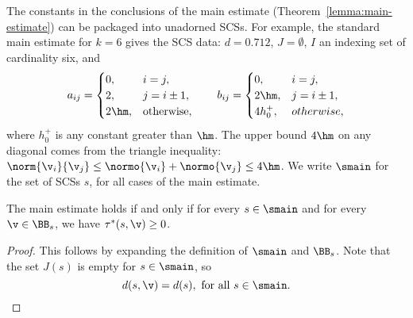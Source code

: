 \begin{definition}[$\smain$]\label{ex:main} 
The constants in the conclusions of the main estimate
  (Theorem~\ref{lemma:main-estimate}) can be packaged into unadorned SCSs.  
For example, the standard main estimate for $k=6$ gives
  the SCS data: $d=0.712$, $J=\emptyset$, $I$ an indexing set
  of cardinality six, and
\[
a_{ij} = \begin{cases} 0, & i=j,\\
  2, & j= i\pm1,\\
  2 \hm, & \text{otherwise},
  \end{cases}
\qquad
b_{ij}=\begin{cases}
 0, & i=j,\\
 2\hm, & j= i\pm1,\\
 4h_0^+, & otherwise,
  \end{cases}
\]
where $h_0^+$ is any constant greater than $\hm$.
The upper bound $4\hm$ on any diagonal comes from the triangle
inequality: $\norm{\v_i}{\v_j} \le \normo{\v_i}+\normo{\v_j} \le
4\hm$.   
We write $\smain$ for the set of SCSs $s$, 
 for all cases of the main
estimate.
\end{definition}
%


\begin{lemma}\label{lemma:main-smain}  
The main estimate holds if and only if for every
$s\in\smain$ and for every $\v\in \BB_s$, we have $\tau^*(s,\v)\ge0$.
\end{lemma}

\begin{proof}  This follows by expanding the definition of $\smain$ and $\BB_s$.
Note that
the set $J(s)$ is empty for $s\in \smain$, so 
\[
d(s,\v) = d(s), \text{ for all } s \in \smain.
\]
\end{proof}











